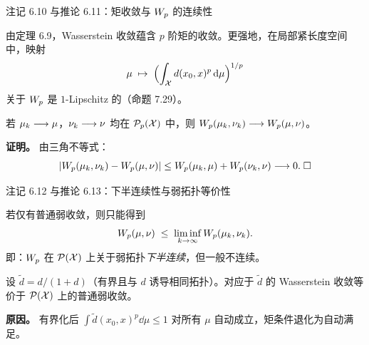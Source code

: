 \begin{frame}{注记 6.10 与推论 6.11：矩收敛与 $W_{p}$ 的连续性}

  由定理 6.9，Wasserstein 收敛蕴含 $p$ 阶矩的收敛。更强地，在局部紧长度空间中，映射
  \[
    \mu\;\mapsto\;\Bigl(\int_{\mathcal{X}} d(x_{0},x)^{p}\,\mathrm{d}\mu\Bigr)^{1/p}
  \]
  关于 $W_{p}$ 是 $1$-Lipschitz 的（命题 7.29）。


  若 $\mu_{k}\longrightarrow\mu$，$\nu_{k}\longrightarrow\nu$ 均在 $\mathcal{P}_{p}(\mathcal{X})$ 中，则
  $W_{p}(\mu_{k},\nu_{k})\longrightarrow W_{p}(\mu,\nu)$。

  \textbf{证明。} 由三角不等式：
  \[
    |W_{p}(\mu_{k},\nu_{k})-W_{p}(\mu,\nu)|
    \le W_{p}(\mu_{k},\mu)+W_{p}(\nu_{k},\nu)\longrightarrow0.\;\square
  \]

\end{frame}

\begin{frame}{注记 6.12 与推论 6.13：下半连续性与弱拓扑等价性}

  若仅有普通弱收敛，则只能得到
  \[
    W_{p}(\mu,\nu) \;\le\; \liminf_{k\to\infty}W_{p}(\mu_{k},\nu_{k}).
  \]
  即：$W_{p}$ 在 $\mathcal{P}(\mathcal{X})$ 上关于弱拓扑\emph{下半连续}，但一般不连续。


  设 $\tilde{d}=d/(1+d)$（有界且与 $d$ 诱导相同拓扑）。对应于 $\tilde{d}$ 的 Wasserstein 收敛等价于 $\mathcal{P}(\mathcal{X})$ 上的普通弱收敛。

  \textbf{原因。} 有界化后 $\int\tilde{d}(x_{0},x)^{p}\dd\mu\le1$ 对所有 $\mu$ 自动成立，矩条件退化为自动满足。

\end{frame}


